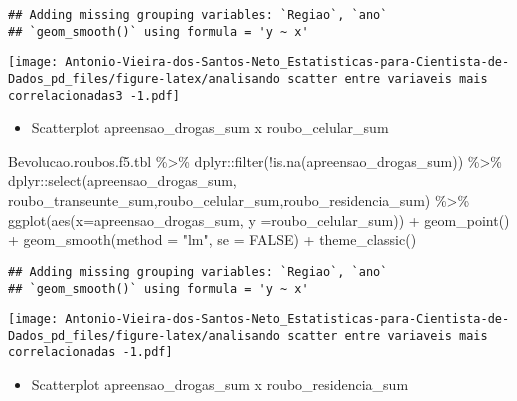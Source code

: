 \documentclass[
]{article}
\newenvironment{Shaded}{\begin{snugshade}}{\end{snugshade}}
\newcommand{\AttributeTok}[1]{\textcolor[rgb]{0.77,0.63,0.00}{#1}}
\newcommand{\ConstantTok}[1]{\textcolor[rgb]{0.00,0.00,0.00}{#1}}
\newcommand{\FunctionTok}[1]{\textcolor[rgb]{0.00,0.00,0.00}{#1}}
\newcommand{\NormalTok}[1]{#1}
\newcommand{\SpecialCharTok}[1]{\textcolor[rgb]{0.00,0.00,0.00}{#1}}
\newcommand{\StringTok}[1]{\textcolor[rgb]{0.31,0.60,0.02}{#1}}
\providecommand{\tightlist}{%
  \setlength{\itemsep}{0pt}\setlength{\parskip}{0pt}}
\begin{document}
\begin{verbatim}
## Adding missing grouping variables: `Regiao`, `ano`
## `geom_smooth()` using formula = 'y ~ x'
\end{verbatim}

\texttt{[image: Antonio-Vieira-dos-Santos-Neto\_Estatisticas-para-Cientista-de-Dados\_pd\_files/figure-latex/analisando scatter entre variaveis mais correlacionadas3 -1.pdf]}

\begin{itemize}
\tightlist
\item
  Scatterplot apreensao\_drogas\_sum x roubo\_celular\_sum
\end{itemize}

\begin{Shaded}
\begin{Highlighting}[]
\NormalTok{Bevolucao.roubos.f5.tbl }\SpecialCharTok{\%\textgreater{}\%}\NormalTok{ dplyr}\SpecialCharTok{::}\FunctionTok{filter}\NormalTok{(}\SpecialCharTok{!}\FunctionTok{is.na}\NormalTok{(apreensao\_drogas\_sum)) }\SpecialCharTok{\%\textgreater{}\%}\NormalTok{ dplyr}\SpecialCharTok{::}\FunctionTok{select}\NormalTok{(apreensao\_drogas\_sum, roubo\_transeunte\_sum,roubo\_celular\_sum,roubo\_residencia\_sum) }\SpecialCharTok{\%\textgreater{}\%} \FunctionTok{ggplot}\NormalTok{(}\FunctionTok{aes}\NormalTok{(}\AttributeTok{x=}\NormalTok{apreensao\_drogas\_sum, }\AttributeTok{y =}\NormalTok{roubo\_celular\_sum)) }\SpecialCharTok{+} \FunctionTok{geom\_point}\NormalTok{() }\SpecialCharTok{+} \FunctionTok{geom\_smooth}\NormalTok{(}\AttributeTok{method =} \StringTok{"lm"}\NormalTok{, }\AttributeTok{se =} \ConstantTok{FALSE}\NormalTok{) }\SpecialCharTok{+} \FunctionTok{theme\_classic}\NormalTok{()}
\end{Highlighting}
\end{Shaded}

\begin{verbatim}
## Adding missing grouping variables: `Regiao`, `ano`
## `geom_smooth()` using formula = 'y ~ x'
\end{verbatim}

\texttt{[image: Antonio-Vieira-dos-Santos-Neto\_Estatisticas-para-Cientista-de-Dados\_pd\_files/figure-latex/analisando scatter entre variaveis mais correlacionadas -1.pdf]}

\begin{itemize}
\tightlist
\item
  Scatterplot apreensao\_drogas\_sum x roubo\_residencia\_sum
\end{itemize}
\end{document}
